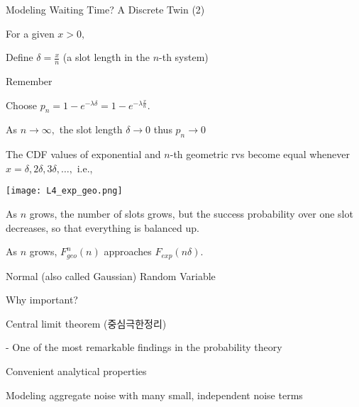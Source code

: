 \documentclass[handout,fleqn,aspectratio=169]{beamer}
\begin{document}
\begin{frame}{Modeling Waiting Time? A Discrete Twin (2)}

{
For a given $x>0,$

\plitemsep 0.05in
\bci 
\item<2-> Define $\delta = \frac{x}{n}$ (a slot length in the $n$-th system)

\item<3-> Remember
\item<4-> Choose $p_n = 1-e^{-\lambda \delta} = 1-e^{-\lambda \frac{x}{n}}.$

\item<5-> As $n \rightarrow \infty,$ the slot length $\delta \rightarrow 0$ thus $p_n \rightarrow 0$ 

\item<5-> The CDF values of exponential and $n$-th geometric rvs become equal whenever $x =\delta, 2\delta, 3\delta, \ldots,$ i.e., 

\eci
}
{
\texttt{[image: L4\_exp\_geo.png]}
\small
\bci
\item<6-> As $n$ grows, the number of slots grows, but the success probability over one slot decreases, so that everything is balanced up. 
\item<7-> As $n$ grows, $F^n_{geo}(n)$ approaches $F_{exp}(n\delta).$
\eci
}
\end{frame}

\begin{frame}{Normal (also called Gaussian) Random Variable}

Why important?

\plitemsep 0.4in
\bci 
\item Central limit theorem (중심극한정리)

- One of the most remarkable findings in the probability theory

\item Convenient analytical properties

\item Modeling aggregate noise with many small, independent noise terms

\eci
\end{frame}
\end{document}

